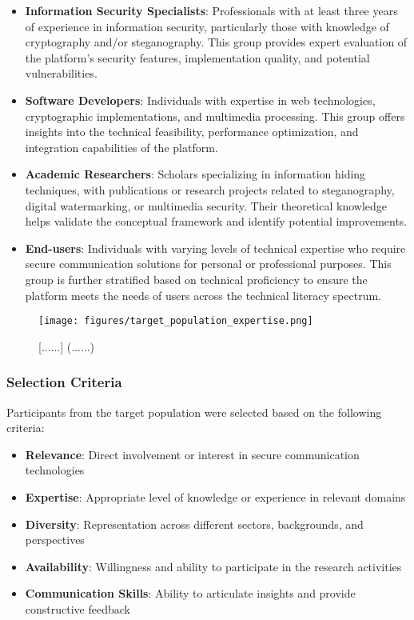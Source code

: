 \documentclass[12pt, a4paper, oneside]{book}
\begin{document}
\begin{itemize}[leftmargin=*]
    \item \textbf{Information Security Specialists}: Professionals with at least three years of experience in information security, particularly those with knowledge of cryptography and/or steganography. This group provides expert evaluation of the platform's security features, implementation quality, and potential vulnerabilities.

    \item \textbf{Software Developers}: Individuals with expertise in web technologies, cryptographic implementations, and multimedia processing. This group offers insights into the technical feasibility, performance optimization, and integration capabilities of the platform.

    \item \textbf{Academic Researchers}: Scholars specializing in information hiding techniques, with publications or research projects related to steganography, digital watermarking, or multimedia security. Their theoretical knowledge helps validate the conceptual framework and identify potential improvements.

    \item \textbf{End-users}: Individuals with varying levels of technical expertise who require secure communication solutions for personal or professional purposes. This group is further stratified based on technical proficiency to ensure the platform meets the needs of users across the technical literacy spectrum.
\end{itemize}

\begin{figure}[htbp]
    \centering
    \texttt{[image: figures/target\_population\_expertise.png]}
    \caption{[......] (......)}
    \label{fig:target_expertise}
\end{figure}

\subsubsection{Selection Criteria}
Participants from the target population were selected based on the following criteria:

\begin{itemize}[leftmargin=*]
    \item \textbf{Relevance}: Direct involvement or interest in secure communication technologies
    \item \textbf{Expertise}: Appropriate level of knowledge or experience in relevant domains
    \item \textbf{Diversity}: Representation across different sectors, backgrounds, and perspectives
    \item \textbf{Availability}: Willingness and ability to participate in the research activities
    \item \textbf{Communication Skills}: Ability to articulate insights and provide constructive feedback
\end{itemize}
\end{document}
